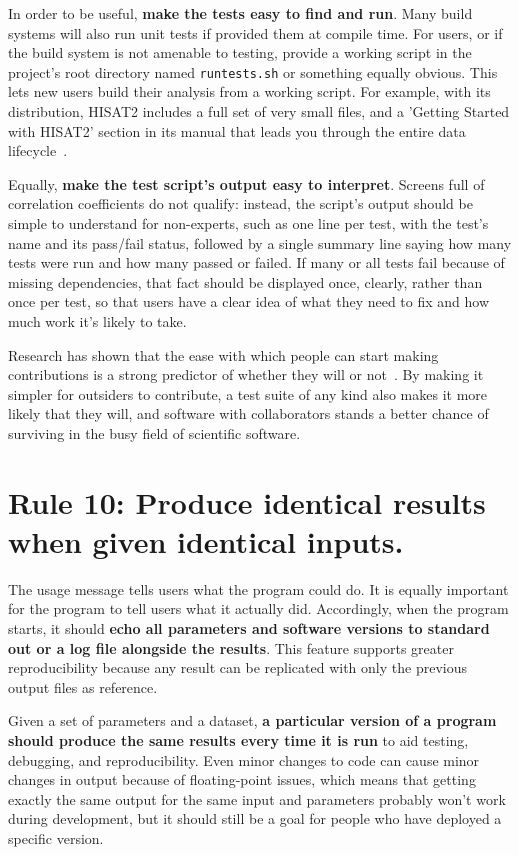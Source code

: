 \documentclass[10pt,letterpaper]{article}
\newcommand{\rulemajor}[1]{\section{#1}}
\newcommand{\ruleminor}[1]{\textbf{#1}}
\newcommand{\reviewed}[1]{{\color{black}#1}}
\begin{document}
In order to be useful, \ruleminor{make the tests easy to find and run}.
Many build systems will also run unit tests if provided them at compile time.
\reviewed{For users, or
if the build system is not amenable to testing, 
provide a working script
in the project's root directory named \texttt{runtests.sh}
or something equally obvious. 
This lets new users build their analysis from a working script.
For example, with its distribution, 
HISAT2 includes a full set of very small files,
and a 'Getting Started with HISAT2' section in its manual 
that leads you through the entire data lifecycle~\cite{pertea2016}.}

Equally, \ruleminor{make the test script's output easy to interpret}. Screens
full of correlation coefficients do not qualify: instead, the script's
output should be simple to understand for non-experts,
such as one line per test, with the test's name
and its pass/fail status, followed by a single summary line saying how
many tests were run and how many passed or failed. If many or all tests
fail because of missing dependencies, that fact should be displayed
once, clearly, rather than once per test, so that users have a clear
idea of what they need to fix and how much work it's likely to take.

Research has shown that the ease with which people can start making
contributions is a strong predictor of whether they will or not~\cite{steinmacher2015}.
By making it simpler for outsiders to contribute,
a test suite of any kind also makes it more likely that they will, and software
with collaborators stands a better chance of surviving in the busy field of
scientific software.

\rulemajor{Rule 10: Produce identical results when given identical inputs.}

\reviewed{The usage message tells users what the program could do.
It is equally important for the program to tell users what it actually did.
Accordingly,
when the program starts, it should \ruleminor{echo all parameters and software
versions to standard out or a log file alongside the results}. This
feature supports greater reproducibility because any result can be
replicated with only the previous output files as reference.}

Given a set of parameters and a dataset, \ruleminor{a particular version of a program
should produce the same results every time it is run}
to aid testing, debugging, and reproducibility.
Even minor changes to code can cause minor changes in output because of floating-point issues,
which means that getting exactly the same output for the same input and parameters
probably won't work during development,
but it should still be a goal for people who have deployed a specific version.
\end{document}
